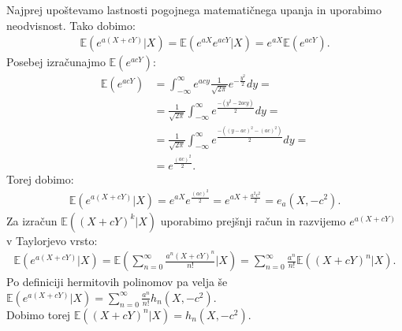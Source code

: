 \documentclass[ letterpaper, titlepage, fleqn]{article}
\begin{document}
\begin{enumerate}[(i)]
Najprej upoštevamo lastnosti pogojnega matematičnega upanja in uporabimo neodvisnost. Tako dobimo:
\begin{equation*}
\begin{aligned}
\mathbb{E}\left( e^{a\left(X+cY\right)}|X\right)=\mathbb{E}\left( e^{aX}e^{acY}|X\right)=e^{aX}\mathbb{E}\left(e^{acY}\right).
\end{aligned}
\end{equation*}
Posebej izračunajmo $\mathbb{E}\left(e^{acY}\right)$:
\begin{equation*}
\begin{aligned}
\mathbb{E}\left(e^{acY}\right)&=\int_{-\infty}^{\infty}e^{acy}\frac{1}{\sqrt{2\pi}} e^{-\frac{y^2}{2}} dy=\\[8px]
&=\frac{1}{\sqrt{2\pi}}\int_{-\infty}^{\infty}e^{\frac{-\left(y^2-2acy\right)}{2}}dy=\\[8px]
&=\frac{1}{\sqrt{2\pi}}\int_{-\infty}^{\infty}e^{\frac{-\left(\left(y-ac\right)^2-\left(ac\right)^2\right)}{2}}dy=\\[8px]
&=e^\frac{(ac)^2}{2}.
\end{aligned}
\end{equation*}
Torej dobimo:
\begin{equation*}
\begin{aligned}
\mathbb{E}\left( e^{a\left(X+cY\right)}|X\right)=e^{aX}e^\frac{\left(ac\right)^2}{2}=e^{aX+\frac{a^2c^2}{2}}=e_a\left(X,-c^2\right).
\end{aligned}
\end{equation*}
Za izračun $\mathbb{E}\left(\left(X+cY\right)^{k}|X\right)$ uporabimo prejšnji račun in razvijemo $e^{a\left(X+cY\right)}$ v Taylorjevo vrsto:
\begin{equation*}
\begin{aligned}
\mathbb{E}\left( e^{a\left(X+cY\right)}|X\right)=\mathbb{E}\left(\sum_{n=0}^{\infty}\frac{a^n\left(X+cY\right)^n}{n!}|X\right)=\sum_{n=0}^{\infty}\frac{a^n}{n!}\mathbb{E}((X+cY)^n|X). 
\end{aligned}
\end{equation*}
Po definiciji hermitovih polinomov pa velja še $\mathbb{E}\left( e^{a\left(X+cY\right)}|X\right)=
\sum_{n=0}^{\infty} \frac{a^n}{n!} h_n\left(X, -c^2\right)$. \\
Dobimo torej $\mathbb{E}\left(\left(X+cY\right)^{n}|X\right)=h_n\left(X,-c^2\right)$.
\end{enumerate}
\end{document}
